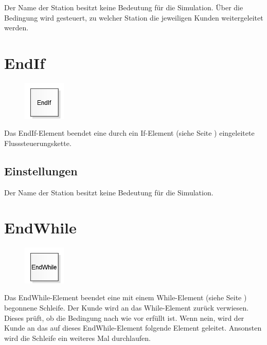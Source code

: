 Der Name der Station besitzt keine Bedeutung für die Simulation. Über die Bedingung
wird gesteuert, zu welcher Station die jeweiligen Kunden weitergeleitet werden.


\section{EndIf}
\label{ref:ModelElementLogicEndIf}

\begin{figure}
\vspace{-22pt}
\includegraphics[width=2cm]{imageModelElementLogicEndIf.png}
\vspace{-22pt}
\end{figure}

Das EndIf-Element beendet eine durch ein
If-Element (siehe Seite \pageref{ref:ModelElementLogicEndIf}) eingeleitete
Flusssteuerungskette.

\subsection*{Einstellungen}

Der Name der Station besitzt keine Bedeutung für die Simulation.


\section{EndWhile}
\label{ref:ModelElementLogicEndWhile}

\begin{figure}
\vspace{-22pt}
\includegraphics[width=2cm]{imageModelElementLogicEndWhile.png}
\vspace{-22pt}
\end{figure}

Das EndWhile-Element beendet eine mit einem
While-Element (siehe Seite \pageref{ref:ModelElementLogicWhile}) begonnene
Schleife. Der Kunde wird an das While-Element zurück verwiesen.
Dieses prüft, ob die Bedingung nach wie vor erfüllt ist.
Wenn nein, wird der Kunde an das auf dieses EndWhile-Element
folgende Element geleitet. Ansonsten wird die Schleife ein
weiteres Mal durchlaufen.

